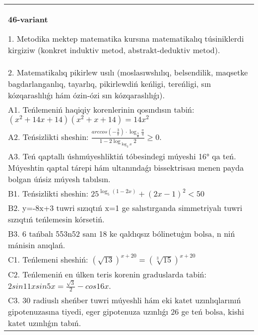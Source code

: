\documentclass{article}
\begin{document}
\begin{tabular}{m{17cm}}
\textbf{46-variant}

1. Metodika mektep matematika kursına matematikalıq túsiniklerdi kirgiziw (konkret induktiv metod, abstrakt-deduktiv metod). \\
2. Matematikalıq pikirlew usılı (moslasıwshılıq, belsendilik, maqsetke bagdarlanganlıq, tayarlıq, pikirlewdiń keńligi, tereńligi, sın kózqaraslılıǵı hám ózin-ózi sın kózqaraslılıǵı). \\
A1. Teńlemeniń haqiqiy korenlerinin qosındısın tabiń: \((x^2 + 14x + 14) (x^2 + x + 14) = 14x^2\) \\
A2. Teńsizlikti sheshin: \(\frac{arccos (- \frac{3}{\pi}) \cdot \log_{\frac{3}{\pi}}\frac{\pi}{4}}{1 - 2\log_{\log_{2}x}2} \geq 0\). \\
A3. Teń qaptallı úshmúyeshliktiń tóbesindegi múyeshi 16° qa teń. Múyeshtin qaptal tárepi hám ultanındaǵı bissektrisası menen payda bolgan úńsiz múyesh tabılsın. \\
B1. Teńsizlikti sheshin: \(25^{\log_{5}{ (1 - 2x) }} + { (2x - 1) }^{2} < 50\) \\
B2. y=-8x+3 tuwri sızıqtıń x=1 ge salıstırganda simmetriyalı tuwri sızıqtıń teńlemesin kórsetiń. \\
B3. 6 tańbalı 553n52 sanı 18 ke qaldıqsız bólinetuģın bolsa, n niń mánisin anıqlań. \\
C1. Teńlemeni sheshiń: \((\sqrt{13}) ^{x + 20} = (\sqrt[3]{15}) ^{x + 20}\) \\
C2. Teńlemeniń en úlken teris korenin graduslarda tabiń: \(2sin11xsin5x = \frac{\sqrt{3}}{2} - cos16x\). \\
C3. 30 radiuslı sheńber tuwri múyeshli hám eki katet uzınlıqlarınıń gipotenuzasına tiyedi, eger gipotenuza uzınlıǵı 26 ge teń bolsa, kishi katet uzınlıǵın tabıń. \\

\end{tabular}
\vspace{1cm}
\end{document}
